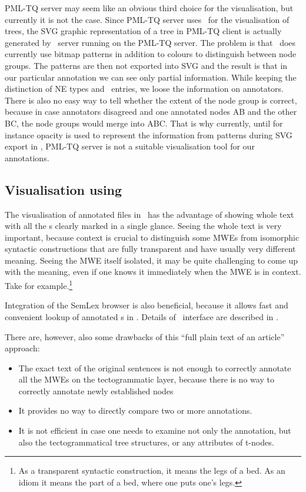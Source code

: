 PML-TQ server may seem like an obvious third choice for the visualisation, but currently it is not the case. Since PML-TQ server uses \tred\ for the visualisation of trees, the SVG graphic representation of a tree in PML-TQ client is actually generated by \btred\ server running on the PML-TQ server. The problem is that \tred\ does  currently use bitmap patterns in addition to colours to distinguish between node groups. The patterns are then not exported into SVG and the result is that in our particular annotation we can see only partial information. While keeping the distinction of NE types and \semlex\ entries, we loose the information on annotators. There is also no easy way to tell whether the extent of the node group is correct, because in case annotators disagreed and one annotated nodes AB and the other BC, the node groups would merge into ABC. That is why currently, until for instance opacity is used to represent the information from patterns during SVG export in \tred, PML-TQ server is not a suitable visualisation tool for our annotations. 


\subsection{Visualisation using \seman}
The visualisation of annotated files in \seman\ has the advantage of showing whole text with all the \mwe{}s clearly marked in a single glance. Seeing the whole text is very important, because context is crucial to distinguish some MWEs from isomorphic syntactic constructions that are fully transparent and have usually very different meaning. Seeing the MWE itself isolated, it may be quite challenging to come up with the meaning, even if one knows it immediately when the MWE is in context. Take  for example.\footnote{As a transparent syntactic construction, it means the legs of a bed. As an idiom it means the part of a bed, where one puts one's legs.} 

Integration of the SemLex browser is also beneficial, because it allows fast and convenient lookup of annotated \mwe{}s in \seman. Details of \seman\ interface are described in . 

There are, however, also some drawbacks of this ``full plain text of an article'' approach: 
\begin{itemize}
\item The exact text of the original sentences is not enough to correctly annotate all the MWEs on the tectogrammatic layer, because there is no way to correctly annotate newly established nodes \see{} \todo
\item It provides no way to directly compare two or more annotations. 
\item It is not efficient in case one needs to examine not only the annotation, but also the tectogrammatical tree structures, or any attributes of t-nodes.
\end{itemize}



